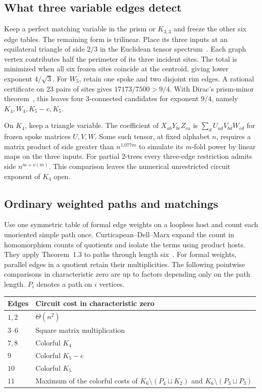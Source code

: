 \documentclass[11pt,letterpaper]{article}
\begin{document}
\subsection{What three variable edges detect}

Keep a perfect matching variable in the prism or \(K_{3,3}\) and freeze the other
six edge tables. The remaining form is trilinear. Place its three inputs at
an equilateral triangle of side \(2/3\) in the Euclidean tensor
spectrum~\cite[Theorem~1.1]{euclid}. Each graph vertex contributes half the
perimeter of its three incident sites. The total is minimized when all six
frozen sites coincide at the centroid, giving lower exponent \(4/\sqrt3\).
For \(W_5\), retain one spoke and two disjoint rim edges. A rational certificate
on 23 pairs of sites gives \(17173/7500>9/4\).
With Dirac's prism-minor theorem~\cite{dirac-structure}, this leaves four 3-connected candidates for
exponent \(9/4\), namely \(K_4,W_4,K_5-e,K_5\).

On \(K_4\), keep a triangle variable. The coefficient of
\(X_{ab}Y_{bc}Z_{ca}\) is \(\sum_d U_{ad}V_{bd}W_{cd}\) for frozen spoke
matrices \(U,V,W\). Some such tensor, at fixed alphabet \(n\), requires a
matrix product of side greater than \(n^{1.077m}\) to simulate its \(m\)-fold
power by linear maps on the three inputs. For partial 2-trees every three-edge
restriction admits side \(n^{m+o(m)}\). This comparison leaves the numerical
unrestricted circuit exponent of \(K_4\) open.

\subsection{Ordinary weighted paths and matchings}

Use one symmetric table of formal edge weights on a loopless host and count
each unoriented simple path once. Curticapean--Dell--Marx expand the count
in homomorphism counts of quotients and isolate the terms using product hosts.
They apply Theorem~1.3 to paths through length six~\cite[p.~3 of the full version]{cdm}. For formal weights,
parallel edges in a quotient retain their multiplicities. The following
pointwise comparisons in characteristic zero are up to factors depending only
on the path length. \(P_i\) denotes a path on \(i\) vertices.

\begin{center}
\begin{tabularx}{\linewidth}{@{}lX@{}}
\toprule Edges & Circuit cost in characteristic zero\\ \midrule
\(1,2\) & \(\Theta(n^2)\)\\
\(3\)--\(6\) & Square matrix multiplication\\
\(7,8\) & Colorful \(K_4\)\\
\(9\) & Colorful \(K_5-e\)\\
\(10\) & Colorful \(K_5\)\\
\(11\) & Maximum of the colorful costs of \(K_6\setminus(P_4\sqcup K_2)\) and \(K_6\setminus(P_3\sqcup P_3)\)\\
\bottomrule
\end{tabularx}
\end{center}
\end{document}
